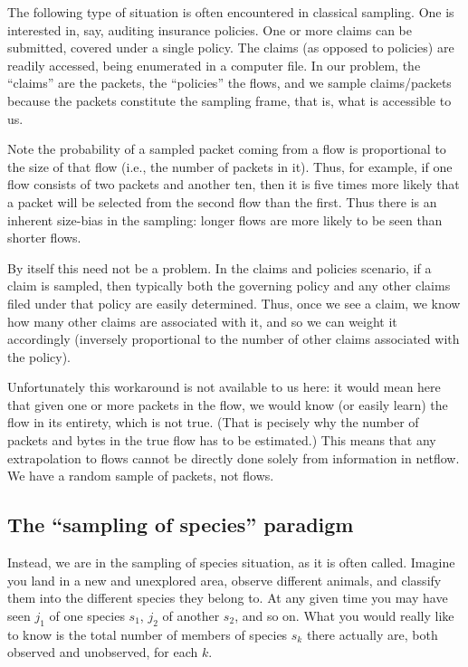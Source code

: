 \documentclass{paper}
\begin{document}
The following type of situation is often encountered in classical sampling.
One is interested in, say, auditing insurance policies. One or more claims can
be submitted, covered under a single policy. The claims (as opposed to
policies) are readily accessed, being enumerated in a computer file. In our
problem, the ``claims'' are the packets, the ``policies'' the flows, and we
sample claims/packets because the packets constitute the sampling frame, that
is, what is accessible to us.

Note the probability of a sampled packet coming from a flow is proportional to
the size of that flow (i.e., the number of packets in it). Thus, for example,
if one flow consists of two packets and another ten, then it is five times more
likely that a packet will be selected from the second flow than the first. Thus
there is an inherent size-bias in the sampling: longer flows are more likely to
be seen than shorter flows.

By itself this need not be a problem. In the claims and policies scenario, if a
claim is sampled, then typically both the governing policy and any other claims
filed under that policy are easily determined. Thus, once we see a claim, we
know how many other claims are associated with it, and so we can weight it
accordingly (inversely proportional to the number of other claims associated
with the policy).

Unfortunately this workaround is not available to us here: it would mean here
that given one or more packets in the flow, we would know (or easily learn) the
flow in its entirety, which is not true. (That is pecisely why the number of
packets and bytes in the true flow has to be estimated.) This means that any
extrapolation to flows cannot be directly done solely from information in
netflow. We have a random sample of packets, not flows.

\subsection{The ``sampling of species'' paradigm}

Instead, we are in the sampling of species situation, as it is often called.
Imagine you land in a new and unexplored area, observe different animals, and
classify them into the different species they belong to. At any given time you
may have seen $j_1$ of one species $s_1$, $j_2$ of another $s_2$, and so on.
What you would really like to know is the total number of members of species
$s_k$ there actually are, both observed and unobserved, for each $k$.
\end{document}
